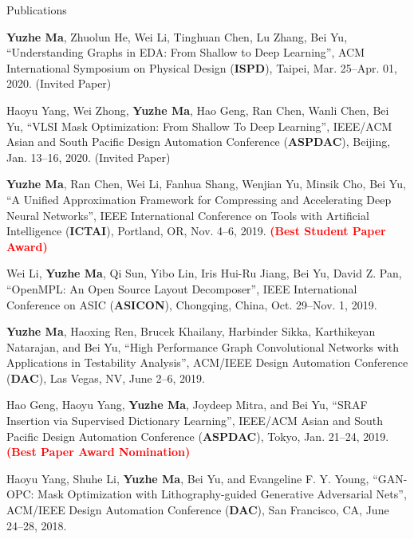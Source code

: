 \begin{rSection}{Publications}
\begin{description}[font=\normalfont]
\item[{[C11]}]{
        \textbf{Yuzhe Ma}, Zhuolun He, Wei Li, Tinghuan Chen, Lu Zhang, Bei Yu, 
        ``Understanding Graphs in EDA: From Shallow to Deep Learning'', 
        ACM International Symposium on Physical Design (\textbf{ISPD}), Taipei, Mar. 25–Apr. 01, 2020. (Invited Paper)
    }

\item[{[C10]}]{
        Haoyu Yang, Wei Zhong, \textbf{Yuzhe Ma}, Hao Geng, Ran Chen, Wanli Chen, Bei Yu, 
        ``VLSI Mask Optimization: From Shallow To Deep Learning'',
        IEEE/ACM Asian and South Pacific Design Automation Conference (\textbf{ASPDAC}), Beijing, Jan. 13--16, 2020. (Invited Paper)
}

\item[{[C9]}]{
   \textbf{Yuzhe Ma}, Ran Chen, Wei Li, Fanhua Shang, Wenjian Yu, Minsik Cho, Bei Yu,
        ``A Unified Approximation Framework for Compressing and Accelerating Deep Neural Networks'', 
        IEEE International Conference on Tools with Artificial Intelligence (\textbf{ICTAI}), Portland, OR, Nov. 4--6, 2019.
        \textcolor{red}{\textbf{(Best Student Paper Award)}}
}

\item[{[C8]}]{
        Wei Li, \textbf{Yuzhe Ma}, Qi Sun, Yibo Lin, Iris Hui-Ru Jiang, Bei Yu, David Z. Pan, 
        ``OpenMPL: An Open Source Layout Decomposer'', 
        IEEE International Conference on ASIC (\textbf{ASICON}), Chongqing, China, Oct. 29--Nov. 1, 2019.
}

\item[{[C7]}]{
	\textbf{Yuzhe Ma}, Haoxing Ren, Brucek Khailany, Harbinder Sikka, Karthikeyan Natarajan, and Bei Yu, 
     ``High Performance Graph Convolutional Networks with Applications in Testability Analysis'',
     ACM/IEEE Design Automation Conference (\textbf{DAC}), Las Vegas, NV, June 2--6, 2019.
}

\item[{[C6]}]{
	Hao Geng, Haoyu Yang, \textbf{Yuzhe Ma}, Joydeep Mitra, and Bei Yu, 
	``SRAF Insertion via Supervised Dictionary Learning'', 
	IEEE/ACM Asian and South Pacific Design Automation Conference (\textbf{ASPDAC}), Tokyo, Jan. 21--24, 2019. \textbf{\textcolor{red}{(Best Paper Award Nomination)}}
}

\item[{[C5]}]{
	Haoyu Yang, Shuhe Li, \textbf{Yuzhe Ma}, Bei Yu, and Evangeline F. Y. Young,
	``GAN-OPC: Mask Optimization with Lithography-guided Generative Adversarial Nets'', 
	ACM/IEEE Design Automation Conference (\textbf{DAC}), San Francisco, CA, June 24--28, 2018.
}


\end{description}
\end{rSection}
